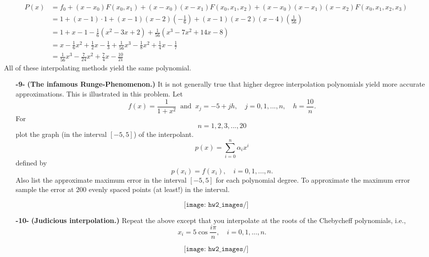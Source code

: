 \documentclass[11pt]{article}
\theoremstyle{definition}
\newcommand{\1}[1]{\mathbf{1} \left \{ #1 \right \}}
\begin{document}
\begin{equation*}
    \begin{split}
        P(x) &= f_0 + (x-x_0) F(x_0 , x_1) + (x-x_0)(x-x_1) F(x_0 , x_1 , x_2) + (x-x_0)(x-x_1)(x-x_2) F(x_0 , x_1 , x_2 , x_3) \\
        &= 1 + (x-1) \cdot 1 + (x-1)(x-2)\left(-\frac{1}{6}\right) + (x-1)(x-2)(x-4)\left(\frac{1}{56}\right) \\
        &= 1 + x - 1 - \frac{1}{6}(x^2 -3x+2) + \frac{1}{56}(x^3 -7x^2 +14x-8) \\
        &= x - \frac{1}{6}x^2 + \frac{1}{2}x - \frac{1}{3} + \frac{1}{56}x^3 - \frac{1}{8}x^2 + \frac{1}{4}x - \frac{1}{7} \\
        &= \frac{1}{56}x^3 - \frac{7}{24}x^2 + \frac{7}{4}x - \frac{10}{21}
    \end{split}
\end{equation*}
All of these interpolating methods yield the same polynomial.

\begin{itemize}
    \item[{\textbf{-9-}}] \textbf{(The infamous Runge-Phenomenon.)}  It is not generally true that higher degree interpolation polynomials yield more accurate approximations.  This is illustrated in this problem.  Let
    \[f(x) = \frac{1}{1+x^2} \ \text{ and } \ x_j = -5+jh, \quad j = 0,1,...,n, \quad h=\frac{10}{n}.\]
    For
    \[n = 1,2,3,...,20\]
    plot the graph (in the interval $[-5,5]$) of the interpolant.
    \[p(x) = \sum_{i=0}^n \alpha_i x^i\]
    defined by
    \[p(x_i) = f(x_i), \quad i = 0,1,...,n.\]
    Also list the approximate maximum error in the interval $[-5,5]$ for each polynomial degree.  To approximate the maximum error sample the error at $200$ evenly spaced points (at least!) in the interval.
\end{itemize}
\[\texttt{[image: hw2\_images/]}\]

\begin{itemize}
    \item[{\textbf{-10-}}] \textbf{(Judicious interpolation.)}  Repeat the above except that you interpolate at the roots of the Chebycheff polynomials, i.e.,
    \begin{equation}
        x_i = 5\cos \frac{i\pi}{n}, \quad i=0,1,...,n.
    \end{equation}
\end{itemize}
\[\texttt{[image: hw2\_images/]}\]
\end{document}
